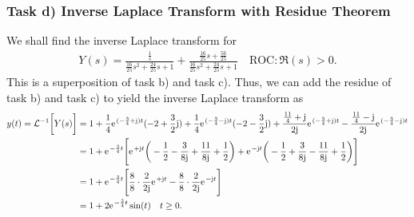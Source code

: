\documentclass[11pt,a4paper,DIV=12]{scrartcl}
\begin{document}
\subsubsection{Task d) Inverse Laplace Transform with Residue Theorem}
We shall find the inverse Laplace transform for
\begin{align}
	Y(s) = \frac{\frac{1}{s}}{\frac{16}{25} s^2 + \frac{24}{25} s + 1}+
	\frac{\frac{16}{25} s + \frac{56}{25}}{\frac{16}{25} s^2 + \frac{24}{25} s + 1}
\quad \text{ROC}: \Re(s) > 0
	.
\end{align}
This is a superposition of task b) and task c). Thus, we can add the residue of task b) and task c) to yield the inverse Laplace transform as
\begin{align}
	y(t) = \mathcal{L}^{-1}\bigg [Y(s)\bigg] &= 1 + \frac{1}{4}\e^{(-\frac{3}{4}+\im)t}(-2+\frac{3}{2}\im) + \frac{1}{4}\e^{(-\frac{3}{4}-\im)t}(-2-\frac{3}{2}\im) + \frac{\frac{11}{4}+\im}{2\im}\e^{(-\frac{3}{4}+\im)t} - \frac{\frac{11}{4}-\im}{2\im}\e^{(-\frac{3}{4}-\im)t} \nonumber \\
	&= 1 + \e^{-\frac{3}{4}t}\Bigg [\e^{+\im t}\bigg (-\frac{1}{2}-\frac{3}{8\im} +\frac{11}{8\im}+\frac{1}{2}\bigg ) + \e^{-\im t} \bigg (-\frac{1}{2}+\frac{3}{8\im} -\frac{11}{8\im}+\frac{1}{2} \bigg ) \Bigg ] \nonumber \\
	&= 1 + \e^{-\frac{3}{4}t}\Bigg [\frac{8}{8}\cdot\frac{2}{2\im}\e^{+\im t}-\frac{8}{8}\cdot\frac{2}{2\im}\e^{-\im t} \Bigg ] \nonumber \\
	&= 1 + 2\e^{-\frac{3}{4}t}\sin(t) \quad t \geq 0.
\end{align}
\end{document}
